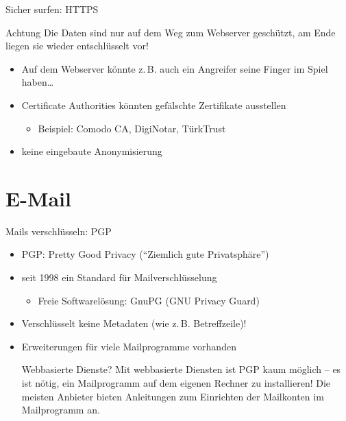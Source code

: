 \documentclass{beamer}
\begin{document}
\begin{frame}{Sicher surfen: HTTPS}
	\begin{alertblock}{Achtung}
		Die Daten sind nur auf dem Weg zum Webserver geschützt, am Ende liegen sie
		wieder entschlüsselt vor!
	\end{alertblock}

	\begin{itemize}
		\item Auf dem Webserver könnte z.\,B. auch ein Angreifer seine Finger im
			Spiel haben\ldots
		\item Certificate Authorities könnten gefälschte Zertifikate ausstellen
		\begin{itemize}
			\item Beispiel: Comodo CA, DigiNotar, TürkTrust
		\end{itemize}
		\item keine eingebaute Anonymisierung
	\end{itemize}
\end{frame}

\section{E-Mail}
\begin{frame}{Mails verschlüsseln: PGP}
\begin{itemize}
	\item PGP: Pretty Good Privacy ("`Ziemlich gute Privatsphäre"')
	\item seit 1998 ein Standard für Mailverschlüsselung
	\begin{itemize}
		\item Freie Softwarelösung: GnuPG (GNU Privacy Guard)
	\end{itemize}
	\item Verschlüsselt keine Metadaten (wie z.\,B. Betreffzeile)!
	\item Erweiterungen für viele Mailprogramme vorhanden
\begin{alertblock}{Webbasierte Dienste?}
	Mit webbasierte Diensten ist PGP kaum möglich -- es ist nötig, ein
	Mailprogramm auf dem eigenen Rechner zu installieren! Die meisten Anbieter
	bieten Anleitungen zum Einrichten der Mailkonten im Mailprogramm an.
\end{alertblock}
\end{itemize}
\end{frame}
\end{document}

